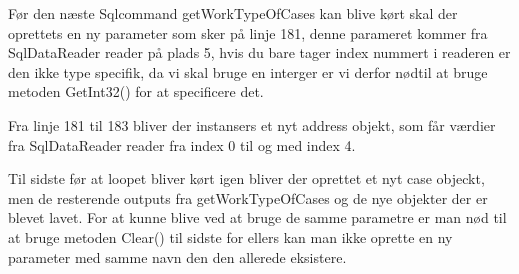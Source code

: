Før den næste Sqlcommand getWorkTypeOfCases kan blive kørt skal der oprettets en ny parameter som sker på linje 181, denne parameret kommer fra SqlDataReader reader på plads 5, hvis du bare tager index nummert i readeren er den ikke type specifik, da vi skal bruge en interger er vi derfor nødtil at bruge metoden GetInt32() for at specificere det.


Fra linje 181 til 183 bliver der instansers et nyt address objekt, som får værdier fra SqlDataReader reader fra index 0 til og med index 4.


Til sidste før at loopet bliver kørt igen bliver der oprettet et nyt case objeckt, men de resterende outputs fra  getWorkTypeOfCases og de nye objekter der er blevet lavet.
For at kunne blive ved at bruge de samme parametre er man nød til at bruge metoden Clear() til sidste for ellers kan man ikke oprette en ny parameter med samme navn den den allerede eksistere.
